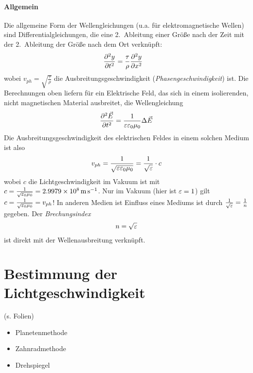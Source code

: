 \paragraph{Allgemein} 
Die allgemeine Form der Wellengleichungen (u.a. für elektromagnetische
Wellen) sind Differentialgleichungen, die eine 2.~Ableitung einer Größe nach der Zeit mit der
2.~Ableitung der Größe nach dem Ort verknüpft: 
\begin{align*}
	\diff[y]{t}&=\frac{\tau}{\rho}\diff[y]{x}
\end{align*}
wobei $v_{ph}=\sqrt{\frac{\tau}{\rho}}$ die Ausbreitungsgeschwindigkeit
(\emph{Phasengeschwindigkeit})%
%
%
ist. 
Die Berechnungen oben liefern für ein Elektrische Feld,
das sich in einem isolierenden, nicht magnetischen Material
ausbreitet, die Wellengleichung
\begin{gather}
  \diff[\vecE]{t} = \frac{1}{\varepsilon\varepsilon_0\mu_0} 
  \Delta \vecE
  \label{elektrWG}
\end{gather}
Die Ausbreitungsgeschwindigkeit des elektrischen Feldes in einem
solchen Medium ist also
\begin{gather*}
  v_{ph} = \frac{1}{\sqrt{\eps\epso\muo}}
  =\frac{1}{\sqrt{\eps}}\cdot c
\end{gather*}
wobei $c$ die Lichtgeschwindigkeit im Vakuum%
 ist mit
$c=\frac{1}{\sqrt{\epso\muo}}=\SI{2.9979e8}{\m\per\s}$.
 Nur im Vakuum (hier ist $\eps = 1$) gilt
$c=\frac{1}{\sqrt{\epso\muo}}=v_{ph}$!
In anderen Medien ist Einfluss eines Mediums ist durch
$\frac{1}{\sqrt{\eps}}=\frac{1}{n}$ gegeben. 
Der \emph{Brechungsindex} 
\begin{gather*}
  n=\sqrt{\eps}
\end{gather*}%
%
ist direkt mit der Wellenausbreitung verknüpft.

\section{Bestimmung der Lichtgeschwindigkeit}
(s. Folien)
\begin{itemize}
	\item Planetenmethode
	\item Zahnradmethode
	\item Drehspiegel
\end{itemize}

